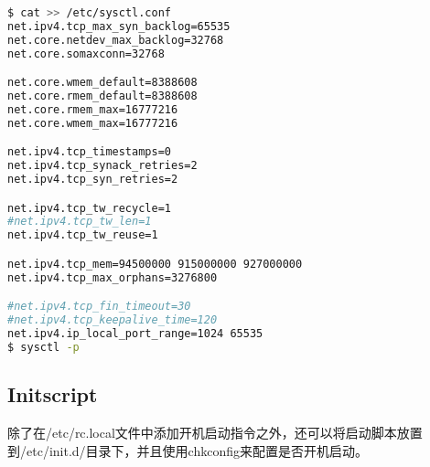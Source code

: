 \begin{lstlisting}[language=bash]
$ cat >> /etc/sysctl.conf
net.ipv4.tcp_max_syn_backlog=65535
net.core.netdev_max_backlog=32768
net.core.somaxconn=32768

net.core.wmem_default=8388608
net.core.rmem_default=8388608
net.core.rmem_max=16777216
net.core.wmem_max=16777216

net.ipv4.tcp_timestamps=0
net.ipv4.tcp_synack_retries=2
net.ipv4.tcp_syn_retries=2

net.ipv4.tcp_tw_recycle=1
#net.ipv4.tcp_tw_len=1
net.ipv4.tcp_tw_reuse=1

net.ipv4.tcp_mem=94500000 915000000 927000000
net.ipv4.tcp_max_orphans=3276800

#net.ipv4.tcp_fin_timeout=30
#net.ipv4.tcp_keepalive_time=120
net.ipv4.ip_local_port_range=1024 65535
$ sysctl -p
\end{lstlisting}



\subsection{Initscript}

除了在/etc/rc.local文件中添加开机启动指令之外，还可以将启动脚本放置到/etc/init.d/目录下，并且使用chkconfig来配置是否开机启动。

